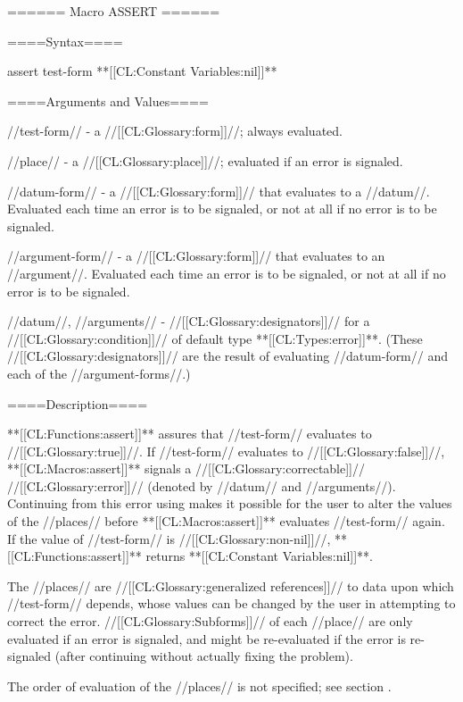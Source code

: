 ====== Macro ASSERT ======

====Syntax====

\DefmacWithValuesNewline assert {test-form } {**[[CL:Constant Variables:nil]]**}

====Arguments and Values====

//test-form// - a //[[CL:Glossary:form]]//; always evaluated.

//place// - a //[[CL:Glossary:place]]//; evaluated if an error is signaled.

//datum-form// - a //[[CL:Glossary:form]]// that evaluates to a //datum//. Evaluated each time an error is to be signaled, or not at all if no error is to be signaled.

//argument-form// - a //[[CL:Glossary:form]]// that evaluates to an //argument//. Evaluated each time an error is to be signaled, or not at all if no error is to be signaled.

//datum//, //arguments// - //[[CL:Glossary:designators]]// for a //[[CL:Glossary:condition]]// of default type **[[CL:Types:error]]**. (These //[[CL:Glossary:designators]]// are the result of evaluating //datum-form// and each of the //argument-forms//.)

====Description====

**[[CL:Functions:assert]]** assures that //test-form// evaluates to //[[CL:Glossary:true]]//. If //test-form// evaluates to //[[CL:Glossary:false]]//, **[[CL:Macros:assert]]** signals a //[[CL:Glossary:correctable]]// //[[CL:Glossary:error]]// (denoted by //datum// and //arguments//). Continuing from this error using  makes it possible for the user to alter the values of the //places// before **[[CL:Macros:assert]]** evaluates //test-form// again. If the value of //test-form// is //[[CL:Glossary:non-nil]]//, **[[CL:Functions:assert]]** returns **[[CL:Constant Variables:nil]]**.

The //places// are //[[CL:Glossary:generalized references]]// to data upon which //test-form// depends, whose values can be changed by the user in attempting to correct the error. //[[CL:Glossary:Subforms]]// of each //place// are only evaluated if an error is signaled, and might be re-evaluated if the error is re-signaled (after continuing without actually fixing the problem).

The order of evaluation of the //places// is not specified; see section {\secref\GenRefSubFormEval}.

